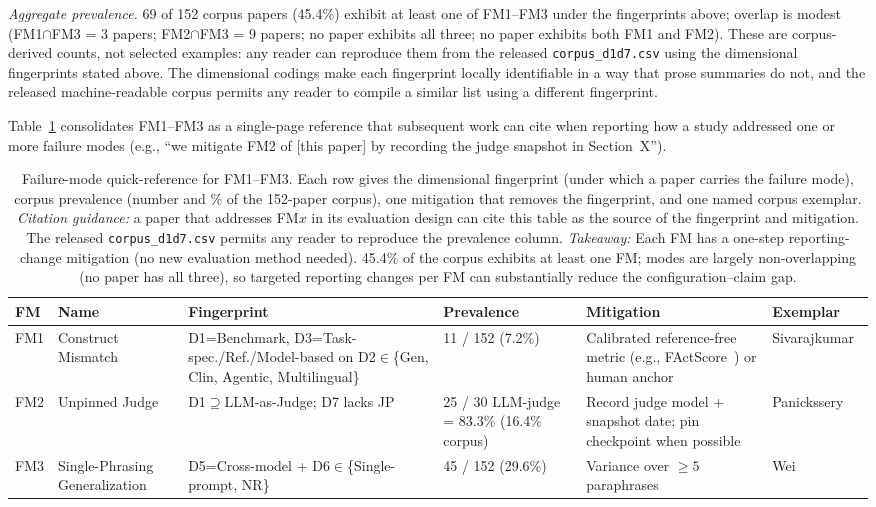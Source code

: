 \documentclass[acmsmall, nonacm, screen]{acmart}
\begin{document}
\textit{Aggregate prevalence.} 69 of 152 corpus papers (45.4\%)
exhibit at least one of FM1--FM3 under the fingerprints above;
overlap is modest (FM1$\cap$FM3 = 3 papers; FM2$\cap$FM3 = 9 papers;
no paper exhibits all three; no paper exhibits both FM1 and FM2). These are corpus-derived counts, not
selected examples: any reader can reproduce them from the released
\texttt{corpus\_d1d7.csv} using the dimensional fingerprints stated
above. The dimensional codings make each fingerprint locally
identifiable in a way that prose summaries do not, and the released
machine-readable corpus permits any reader to compile a similar list
using a different fingerprint.

Table~\ref{tab:fmsummary} consolidates FM1--FM3 as a single-page
reference that subsequent work can cite when reporting how a study
addressed one or more failure modes (e.g., ``we mitigate FM2 of
[this paper] by recording the judge snapshot in Section~X'').

\begin{table}[!t]
\caption{Failure-mode quick-reference for FM1--FM3. Each row gives
the dimensional fingerprint (under which a paper carries the
failure mode), corpus prevalence (number and \% of the 152-paper
corpus), one mitigation that removes the fingerprint, and one
named corpus exemplar. \textit{Citation guidance:} a paper that
addresses FM$x$ in its evaluation design can cite this table as the
source of the fingerprint and mitigation. The released
\texttt{corpus\_d1d7.csv} permits any reader to reproduce the
prevalence column.
\textit{Takeaway:} Each FM has a one-step reporting-change mitigation (no new evaluation method needed). 45.4\% of the corpus exhibits at least one FM; modes are largely non-overlapping (no paper has all three), so targeted reporting changes per FM can substantially reduce the configuration--claim gap.}
\label{tab:fmsummary}
\centering
\footnotesize
\setlength{\tabcolsep}{4pt}
\begin{tabular}{p{0.5cm} p{1.9cm} p{3.2cm} p{1.6cm} p{2.8cm} p{1.8cm}}
\toprule
\textbf{FM} & \textbf{Name} & \textbf{Fingerprint} & \textbf{Prevalence} & \textbf{Mitigation} & \textbf{Exemplar} \\
\midrule
FM1 & Construct Mismatch & D1=Benchmark, D3=Task-spec./Ref./Model-based on D2$\in$\{Gen, Clin, Agentic, Multilingual\} & 11 / 152 (7.2\%) & Calibrated reference-free metric (e.g., FActScore~\cite{factscore2023}) or human anchor & Sivarajkumar~\cite{sivarajkumar2024empirical} \\
\midrule
FM2 & Unpinned Judge & D1$\supseteq$LLM-as-Judge; D7 lacks JP & 25 / 30 LLM-judge = 83.3\% (16.4\% corpus) & Record judge model + snapshot date; pin checkpoint when possible & Panickssery~\cite{judgingjudges2024} \\
\midrule
FM3 & Single-Phrasing Generalization & D5=Cross-model + D6$\in$\{Single-prompt, NR\} & 45 / 152 (29.6\%) & Variance over $\geq 5$ paraphrases~\cite{mizrahi2024state, zhuo2024prosa} & Wei~\cite{wei2022chain} \\
\bottomrule
\end{tabular}
\end{table}
\end{document}
